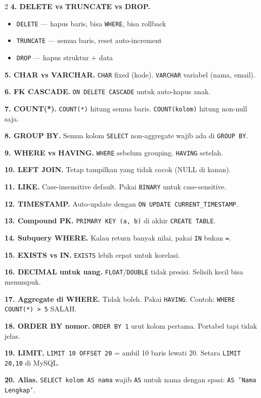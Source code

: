 \documentclass[10pt,a4paper]{article}
\begin{document}
\begin{multicols*}{2}
	\textbf{4. DELETE vs TRUNCATE vs DROP.}
	\begin{itemize}
		\item \texttt{DELETE} — hapus baris, bisa \texttt{WHERE}, bisa rollback
		\item \texttt{TRUNCATE} — semua baris, reset auto-increment
		\item \texttt{DROP} — hapus struktur + data
	\end{itemize}

	\textbf{5. CHAR vs VARCHAR.} \texttt{CHAR} fixed (kode). \texttt{VARCHAR} variabel (nama, email).

	\textbf{6. FK CASCADE.} \texttt{ON DELETE CASCADE} untuk auto-hapus anak.

	\textbf{7. COUNT(*).} \texttt{COUNT(*)} hitung semua baris. \texttt{COUNT(kolom)} hitung non-null saja.

	\textbf{8. GROUP BY.} Semua kolom \texttt{SELECT} non-aggregate wajib ada di \texttt{GROUP BY}.

	\textbf{9. WHERE vs HAVING.} \texttt{WHERE} sebelum grouping. \texttt{HAVING} setelah.

	\textbf{10. LEFT JOIN.} Tetap tampilkan yang tidak cocok (NULL di kanan).

	\textbf{11. LIKE.} Case-insensitive default. Pakai \texttt{BINARY} untuk case-sensitive.

	\textbf{12. TIMESTAMP.} Auto-update dengan \texttt{ON UPDATE CURRENT\_TIMESTAMP}.

	\textbf{13. Compound PK.} \texttt{PRIMARY KEY (a, b)} di akhir \texttt{CREATE TABLE}.

	\textbf{14. Subquery WHERE.} Kalau return banyak nilai, pakai \texttt{IN} bukan \texttt{=}.

	\textbf{15. EXISTS vs IN.} \texttt{EXISTS} lebih cepat untuk korelasi.

	\textbf{16. DECIMAL untuk uang.} \texttt{FLOAT}/\texttt{DOUBLE} tidak presisi. Selisih kecil bisa menumpuk.

	\textbf{17. Aggregate di WHERE.} Tidak boleh. Pakai \texttt{HAVING}. Contoh: \texttt{WHERE COUNT(*) > 5} SALAH.

	\textbf{18. ORDER BY nomor.} \texttt{ORDER BY 1} urut kolom pertama. Portabel tapi tidak jelas.

	\textbf{19. LIMIT.} \texttt{LIMIT 10 OFFSET 20} = ambil 10 baris lewati 20. Setara \texttt{LIMIT 20,10} di MySQL.

	\textbf{20. Alias.} \texttt{SELECT kolom AS nama} wajib \texttt{AS} untuk nama dengan spasi: \texttt{AS 'Nama Lengkap'}.

\end{multicols*}
\end{document}
